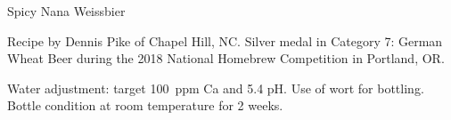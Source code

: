 \begin{recipe}{Spicy Nana Weissbier}

\begin{aboutblock}
Recipe by Dennis Pike of Chapel Hill, NC. Silver medal in Category 7: German Wheat
Beer during the 2018 National Homebrew Competition in Portland, OR. \sourceaha
\end{aboutblock}


\begin{methodandtiming}
 
\begin{mashsteps}
\end{mashsteps}

\begin{fermentationsteps}
\end{fermentationsteps}

\begin{directions}
Water adjustment: target 100~ppm Ca and 5.4 pH. Use  of wort for
bottling. Bottle condition at room temperature for 2 weeks.
\end{directions}

\end{methodandtiming}

\recipebreak

\begin{ingredientsblock}

\begin{malts}
\end{malts}

\begin{hops}
\end{hops}


\begin{twists}
\end{twists}

\end{ingredientsblock}

\end{recipe}

